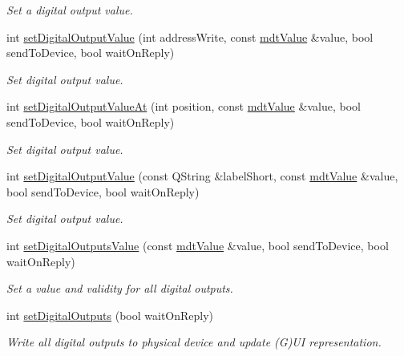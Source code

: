 \begin{DoxyCompactItemize}
\begin{DoxyCompactList}\small\item\em Set a digital output value. \end{DoxyCompactList}\item 
int \hyperlink{classmdt_multi_io_device_a82aea9d2c012c3c03819fe5795c65086}{set\-Digital\-Output\-Value} (int address\-Write, const \hyperlink{classmdt_value}{mdt\-Value} \&value, bool send\-To\-Device, bool wait\-On\-Reply)
\begin{DoxyCompactList}\small\item\em Set digital output value. \end{DoxyCompactList}\item 
int \hyperlink{classmdt_multi_io_device_a5916d5faef10b1f290ae8aa10319baad}{set\-Digital\-Output\-Value\-At} (int position, const \hyperlink{classmdt_value}{mdt\-Value} \&value, bool send\-To\-Device, bool wait\-On\-Reply)
\begin{DoxyCompactList}\small\item\em Set digital output value. \end{DoxyCompactList}\item 
int \hyperlink{classmdt_multi_io_device_a8c3aae522f8a991f8073d161d05fbe7b}{set\-Digital\-Output\-Value} (const Q\-String \&label\-Short, const \hyperlink{classmdt_value}{mdt\-Value} \&value, bool send\-To\-Device, bool wait\-On\-Reply)
\begin{DoxyCompactList}\small\item\em Set digital output value. \end{DoxyCompactList}\item 
int \hyperlink{classmdt_multi_io_device_aae673bac285929dc4ff005fbc576b787}{set\-Digital\-Outputs\-Value} (const \hyperlink{classmdt_value}{mdt\-Value} \&value, bool send\-To\-Device, bool wait\-On\-Reply)
\begin{DoxyCompactList}\small\item\em Set a value and validity for all digital outputs. \end{DoxyCompactList}\item 
int \hyperlink{classmdt_multi_io_device_a2149cfc42f04c8afb6f2d20dbd3bd391}{set\-Digital\-Outputs} (bool wait\-On\-Reply)
\begin{DoxyCompactList}\small\item\em Write all digital outputs to physical device and update (G)U\-I representation. \end{DoxyCompactList}\end{DoxyCompactItemize}
